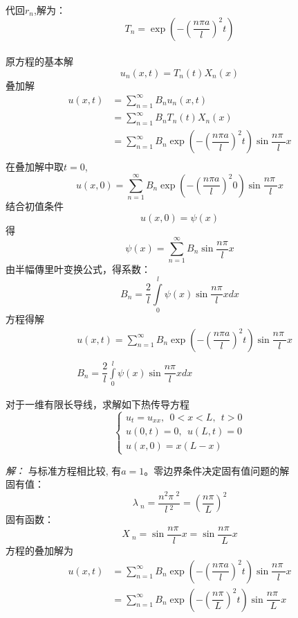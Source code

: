 	代回$r_n$,解为：$$ T_n=  \exp(-(\dfrac{n\pi a}{l})^2 t)$$ \\  
	原方程的基本解
	\begin{equation*}
		u_n(x,t)= T_n(t)X_n(x)
	\end{equation*}
	叠加解
	$$\begin{array}{llll}
		u(x,t) &= \sum\limits_{n=1}^{\infty }B_n u_n(x,t) \\
		&= \sum\limits_{n=1}^{\infty }B_n T_n(t)X_n(x)\\
		&= \sum\limits_{n=1}^{\infty }B_n  \exp(-(\dfrac{n\pi a}{l})^2 t) \sin \dfrac{n\pi~}{l} x \\
	\end{array}$$ 
	在叠加解中取$t=0$, 
	\begin{equation*}
		u(x,0) = \sum\limits_{n=1}^{\infty }B_n  \exp(-(\dfrac{n\pi a}{l})^2 0) \sin \dfrac{n\pi~}{l} x
	\end{equation*}
	结合初值条件\\ 
	$$ \displaystyle u(x,0)= \psi(x)$$ 
	得
	$$\psi (x)=\sum\limits_{n=1}^{\infty } B_n \sin \dfrac{ n\pi }{l} x$$ 
	由半幅傳里叶变换公式，得系数：\\  
	$$ \displaystyle B_n=  \dfrac{2}{l}\int\limits_{0 }^{l}  \psi (x) \sin \dfrac{ n\pi }{l} x dx $$
	方程得解
	$$
	\boxed{\begin{aligned}
			&u(x,t) = \sum\limits_{n=1}^{\infty }B_n  \exp(-(\dfrac{n\pi a}{l})^2 t) \sin \dfrac{n\pi~}{l} x \\
			~\\
			&B_n =  \dfrac{2}{l}\int\limits_{0 }^{l}  \psi (x) \sin \dfrac{ n\pi }{l} x dx  
		\end{aligned}} 
	$$ 
\begin{example}
对于一维有限长导线，求解如下热传导方程 
$$\displaystyle \begin{cases}
	u_{t} =u_{xx} ,~~ 0<x<L, ~~t>0\\
	u(0,t) =0, ~~u(L,t)=0 \\
	u(x,0) =x(L-x)
\end{cases}$$ 
\end{example}
\emph{解：}
	与标准方程相比较, 有$ a=1$。零边界条件决定固有值问题的解\\
	固有值：$$\displaystyle  \lambda~_n=\dfrac{n^2\pi~^2}{l~^2 }= (\dfrac{n\pi }{L}) ^2$$  
	固有函数：$$\displaystyle  X~_n=\sin \dfrac{n\pi~}{l} x=\sin \dfrac{n\pi~}{L} x $$
    方程的叠加解为
	$$\displaystyle \begin{aligned}
		u(x,t)&=\sum\limits_{n=1}^{\infty } B_n  \exp(-(\dfrac{n\pi a}{l})^2 t) \sin \dfrac{n\pi~}{l} x\\
		&= \sum\limits_{n=1}^{\infty } B_n  \exp(-(\dfrac{n\pi}{L})^2 t) \sin \dfrac{n\pi~}{L} x 
	\end{aligned}$$ 

